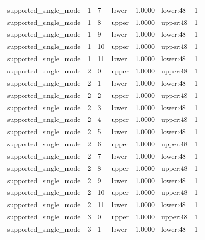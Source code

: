 \documentclass{article}
\begin{document}
\begin{table}[tbp]
{\begin{tabular}{lllllll}
supported\_single\_mode & 1 & 7 & lower & 1.0000 & lower:48 & 1 \\
supported\_single\_mode & 1 & 8 & upper & 1.0000 & upper:48 & 1 \\
supported\_single\_mode & 1 & 9 & lower & 1.0000 & lower:48 & 1 \\
supported\_single\_mode & 1 & 10 & upper & 1.0000 & upper:48 & 1 \\
supported\_single\_mode & 1 & 11 & lower & 1.0000 & lower:48 & 1 \\
supported\_single\_mode & 2 & 0 & upper & 1.0000 & upper:48 & 1 \\
supported\_single\_mode & 2 & 1 & lower & 1.0000 & lower:48 & 1 \\
supported\_single\_mode & 2 & 2 & upper & 1.0000 & upper:48 & 1 \\
supported\_single\_mode & 2 & 3 & lower & 1.0000 & lower:48 & 1 \\
supported\_single\_mode & 2 & 4 & upper & 1.0000 & upper:48 & 1 \\
supported\_single\_mode & 2 & 5 & lower & 1.0000 & lower:48 & 1 \\
supported\_single\_mode & 2 & 6 & upper & 1.0000 & upper:48 & 1 \\
supported\_single\_mode & 2 & 7 & lower & 1.0000 & lower:48 & 1 \\
supported\_single\_mode & 2 & 8 & upper & 1.0000 & upper:48 & 1 \\
supported\_single\_mode & 2 & 9 & lower & 1.0000 & lower:48 & 1 \\
supported\_single\_mode & 2 & 10 & upper & 1.0000 & upper:48 & 1 \\
supported\_single\_mode & 2 & 11 & lower & 1.0000 & lower:48 & 1 \\
supported\_single\_mode & 3 & 0 & upper & 1.0000 & upper:48 & 1 \\
supported\_single\_mode & 3 & 1 & lower & 1.0000 & lower:48 & 1 \\
\bottomrule
\end{tabular}
}
\end{table}

\clearpage
\end{document}
